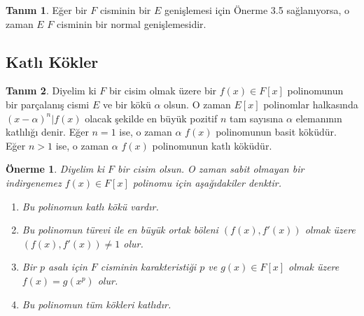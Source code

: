 \documentclass[draft]{article}
\newtheorem{prop}[thm]{Önerme}
\theoremstyle{definition}
\newtheorem{defn}{Tanım}[section]
\theoremstyle{remark}
\begin{document}
    	    \begin{defn}
    	        Eğer bir $F$ cisminin bir $E$ genişlemesi için Önerme 3.5 sağlanıyorsa, o zaman $E$ $F$ cisminin bir normal genişlemesidir.
    	    \end{defn}
	        
    	\subsection{Katlı Kökler}
    	
    	    \begin{defn}
    	        Diyelim ki $F$ bir cisim olmak üzere bir $f(x) \in F[x]$ polinomunun bir parçalanış cismi $E$ ve bir kökü $\alpha$ olsun. O zaman $E[x]$ polinomlar halkasında $(x - \alpha)^n | f(x)$ olacak şekilde en büyük pozitif $n$ tam sayısına $\alpha$ elemanının katlılığı denir. Eğer $n = 1$ ise, o zaman $\alpha$ $f(x)$ polinomunun basit köküdür. Eğer $n > 1$ ise, o zaman $\alpha$ $f(x)$ polinomunun katlı köküdür.
    	    \end{defn}
    	    
    	    \begin{prop}
    	        Diyelim ki $F$ bir cisim olsun. O zaman sabit olmayan bir indirgenemez $f(x) \in F[x]$ polinomu için aşağıdakiler denktir.
    	        \begin{enumerate}
				\renewcommand{\labelenumi}{(\roman{enumi})}
				    \item Bu polinomun katlı kökü vardır.
				    \item Bu polinomun türevi ile en büyük ortak böleni $(f(x), f'(x))$ olmak üzere $(f(x), f'(x)) \neq 1$ olur.
				    \item Bir $p$ asalı için $F$ cisminin karakteristiği $p$ ve $g(x) \in F[x]$ olmak üzere $f(x) = g(x^p)$ olur.
				    \item Bu polinomun tüm kökleri katlıdır.
				\end{enumerate}
    	    \end{prop}
    	    
\end{document}
